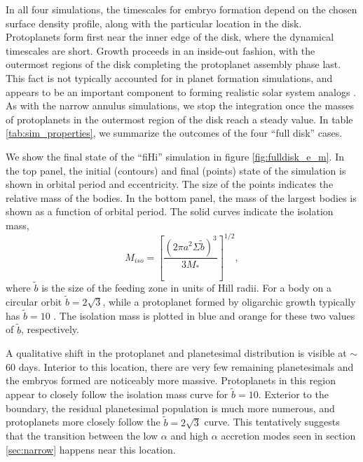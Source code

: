 \documentclass[twocolumn]{aastex63}
\begin{document}
In all four simulations, the timescales for embryo formation depend on
the chosen surface density profile, along with the particular location
in the disk. Protoplanets form first near the inner edge of the disk,
where the dynamical timescales are short. Growth proceeds in an
inside-out fashion, with the outermost regions of the disk completing
the protoplanet assembly phase last. This fact is not typically
accounted for in planet formation simulations, and appears to be an
important component to forming realistic solar system analogs
\citep{clement20}. As with the narrow annulus simulations, we stop the
integration once the masses of protoplanets in the outermost region of
the disk reach a steady value. In table \ref{tab:sim_properties}, we
summarize the outcomes of the four ``full disk'' cases.

We show the final state of the ``fiHi'' simulation in figure \ref{fig:fulldisk_e_m}. In the top panel, the initial (contours) and final (points) state of the simulation is shown in orbital period and eccentricity. The size of the points indicates the relative mass of the bodies. In the bottom panel, the mass of the largest bodies is shown as a function of orbital period. The solid curves indicate the isolation mass,
\begin{equation}\label{eq:iso}
	M_{iso} = \left[ \frac{\left( 2 \pi a^2 \Sigma \tilde{b} \right)^3}{3 M_{*}} \right]^{1/2},
\end{equation}
where $\tilde{b}$ is the size of the feeding zone in units
of Hill radii. For a body on a circular orbit $\tilde{b} = 2
\sqrt{3}$, while a protoplanet formed by oligarchic growth typically
has $\tilde{b} = 10$ \citep{kokubo98}.
The isolation mass is plotted in blue and orange for these two values of $\tilde{b}$, respectively.

A qualitative shift in the protoplanet and planetesimal distribution is visible at $\sim$ 60 days. Interior to this location, there are very few remaining planetesimals and the embryos formed are noticeably more massive. Protoplanets in this region appear to closely follow the isolation mass curve for $\tilde{b} = 10$. Exterior to the boundary, the residual planetesimal population is much more numerous, and protoplanets more closely follow the $\tilde{b} = 2 \sqrt{3}$ curve. This tentatively suggests that the transition between the low $\alpha$ and high $\alpha$ accretion modes seen in section \ref{sec:narrow} happens near this location.

\end{document}
